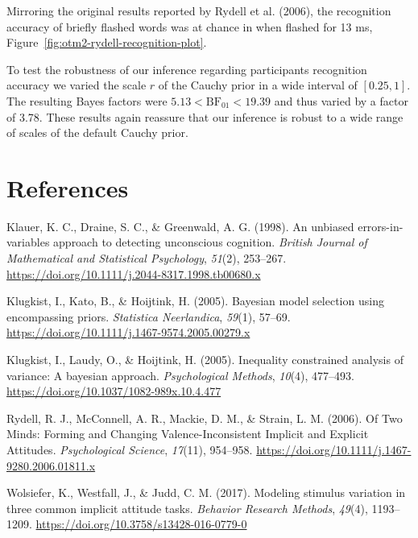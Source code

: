\documentclass[
  doc]{apa6}
\newlength{\cslhangindent}
\newlength{\cslentryspacingunit} %
\newenvironment{CSLReferences}[2] %
 {%
  \setlength{\parindent}{0pt}
  \ifodd #1
  \let\oldpar\par
  \def\par{\hangindent=\cslhangindent\oldpar}
  \fi
  \setlength{\parskip}{#2\cslentryspacingunit}
 }%
 {}
\begin{document}
Mirroring the original results reported by Rydell et al. (2006), the recognition accuracy of briefly flashed words was at chance in when flashed for 13 ms, Figure~\ref{fig:otm2-rydell-recognition-plot}.

To test the robustness of our inference regarding participants recognition accuracy we varied the scale \(r\) of the Cauchy prior in a wide interval of \([0.25, 1]\).
The resulting Bayes factors were \(5.13< \textrm{BF}_{01} < 19.39\) and thus varied by a factor of 3.78.
These results again reassure that our inference is robust to a wide range of scales of the default Cauchy prior.

\newpage

\hypertarget{references}{%
\section{References}\label{references}}

\begingroup
\setlength{\parskip}{0pt}
\setlength{\parindent}{-0.5in}
\setlength{\leftskip}{0.5in}

\hypertarget{refs}{}
\begin{CSLReferences}{1}{0}
\leavevmode{}%
Klauer, K. C., Draine, S. C., \& Greenwald, A. G. (1998). An unbiased errors-in-variables approach to detecting unconscious cognition. \emph{British Journal of Mathematical and Statistical Psychology}, \emph{51}(2), 253--267. \url{https://doi.org/10.1111/j.2044-8317.1998.tb00680.x}

\leavevmode{}%
Klugkist, I., Kato, B., \& Hoijtink, H. (2005). Bayesian model selection using encompassing priors. \emph{Statistica Neerlandica}, \emph{59}(1), 57--69. \url{https://doi.org/10.1111/j.1467-9574.2005.00279.x}

\leavevmode{}%
Klugkist, I., Laudy, O., \& Hoijtink, H. (2005). Inequality constrained analysis of variance: A bayesian approach. \emph{Psychological Methods}, \emph{10}(4), 477--493. \url{https://doi.org/10.1037/1082-989x.10.4.477}

\leavevmode{}%
Rydell, R. J., McConnell, A. R., Mackie, D. M., \& Strain, L. M. (2006). Of {Two Minds}: {Forming} and {Changing Valence}-{Inconsistent Implicit} and {Explicit Attitudes}. \emph{Psychological Science}, \emph{17}(11), 954--958. \url{https://doi.org/10.1111/j.1467-9280.2006.01811.x}

\leavevmode{}%
Wolsiefer, K., Westfall, J., \& Judd, C. M. (2017). Modeling stimulus variation in three common implicit attitude tasks. \emph{Behavior Research Methods}, \emph{49}(4), 1193--1209. \url{https://doi.org/10.3758/s13428-016-0779-0}

\end{CSLReferences}

\endgroup
\end{document}
